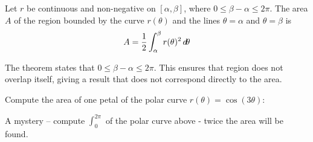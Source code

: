 \documentclass{ximera}
\begin{document}
\begin{theorem}
Let $r$ be continuous and non-negative on $[\alpha,\beta]$, where
$0\leq \beta-\alpha\leq 2\pi$. The area $A$ of the region bounded by
the curve $r(\theta)$ and the lines $\theta=\alpha$ and
$\theta=\beta$ is
\[
A  =  \frac12\int_\alpha^\beta r(\theta)^2 \mathop{}\!d\! \theta  
\]
\end{theorem}

The theorem states that $0\leq \beta-\alpha\leq 2\pi$. This ensures
that region does not overlap itself, giving a result that does not
correspond directly to the area.


\begin{example}
  Compute the area of one petal of the polar curve $r(\theta) =
  \cos(3\theta)$:
  \begin{image}
  \end{image}
\end{example}



A mystery -- compute $\int_0^{2\pi}$ of the polar curve above - twice the area will be found.
\end{document}
